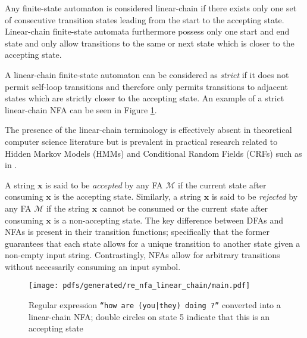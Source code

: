 \begin{definition}
  \label{def:lfa}
  Any finite-state automaton is considered linear-chain if there exists only one
  set of consecutive transition states leading from the start to the accepting
  state. Linear-chain finite-state automata furthermore possess only one start
  and end state and only allow transitions to the same or next state which is
  closer to the accepting state.

  \begin{remark}
    A linear-chain finite-state automaton can be considered as \textit{strict}
    if it does not permit self-loop transitions and therefore only permits
    transitions to adjacent states which are strictly closer to the
    accepting state. An example of a strict linear-chain NFA can be seen in
    Figure \ref{fig:regex-fsa}.
  \end{remark}

  \begin{remark}
    The presence of the linear-chain terminology is effectively absent in
    theoretical computer science literature but is prevalent in practical
    research related to Hidden Markov Models (HMMs) and Conditional Random
    Fields (CRFs) such as in \citet{tsuruoka2009fast}.
  \end{remark}
  
\end{definition}

A string $\pmb{x}$ is said to be \textit{accepted} by any FA $\mathcal{M}$ if
the current state after consuming $\pmb{x}$ is the accepting state. Similarly, a
string $\pmb{x}$ is said to be \textit{rejected} by any FA $\mathcal{M}$ if the
string $\pmb{x}$ cannot be consumed or the current state after consuming
$\pmb{x}$ is a non-accepting state. The key difference between DFAs and NFAs is
present in their transition functions; specifically that the former guarantees
that each state allows for a unique transition to another state given a
non-empty input string. Contrastingly, NFAs allow for arbitrary transitions
without necessarily consuming an input symbol.

\begin{figure}[t]
  \centering
  \texttt{[image: pdfs/generated/re\_nfa\_linear\_chain/main.pdf]}
  \caption{Regular expression \texttt{``how are (you|they) doing ?''} converted
    into a linear-chain NFA; double circles on state 5 indicate that this is an
    accepting state}
  \label{fig:regex-fsa}
\end{figure}

